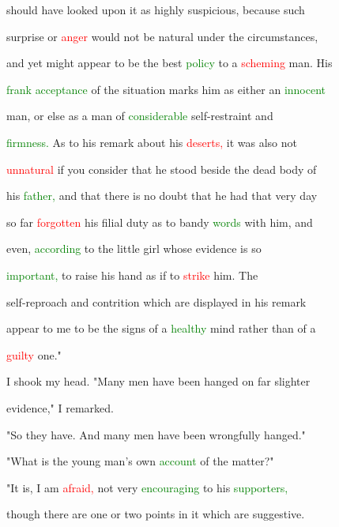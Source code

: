  should have looked upon it as highly \textcolor{BurntOrange}{suspicious,} because such

 \textcolor{BurntOrange}{surprise} or \textcolor{red}{anger} would not be natural under the circumstances,

 and yet might appear to be the best \textcolor{green}{policy} to a \textcolor{red}{scheming} man. His

 \textcolor{green}{frank} \textcolor{green}{acceptance} of the situation marks him as either an \textcolor{green}{innocent}

 man, or else as a man of \textcolor{green}{considerable} self-restraint and

 \textcolor{green}{firmness.} As to his remark about his \textcolor{red}{deserts,} it was also not

 \textcolor{red}{unnatural} if you consider that he stood beside the dead body of

 his \textcolor{green}{father,} and that there is no \textcolor{BurntOrange}{doubt} that he had that very day

 so far \textcolor{red}{forgotten} his filial duty as to bandy \textcolor{green}{words} with him, and

 even, \textcolor{green}{according} to the little girl whose evidence is so

 \textcolor{green}{important,} to raise his hand as if to \textcolor{red}{strike} him. The

 self-reproach and contrition which are displayed in his remark

 appear to me to be the signs of a \textcolor{green}{healthy} mind rather than of a

 \textcolor{red}{guilty} one."



 I shook my head. "Many men have been hanged on far slighter

 evidence," I remarked.



 "So they have. And many men have been wrongfully hanged."



 "What is the \textcolor{BurntOrange}{young} man's own \textcolor{green}{account} of the matter?"



 "It is, I am \textcolor{red}{afraid,} not very \textcolor{green}{encouraging} to his \textcolor{green}{supporters,}

 though there are one or two points in it which are suggestive.

